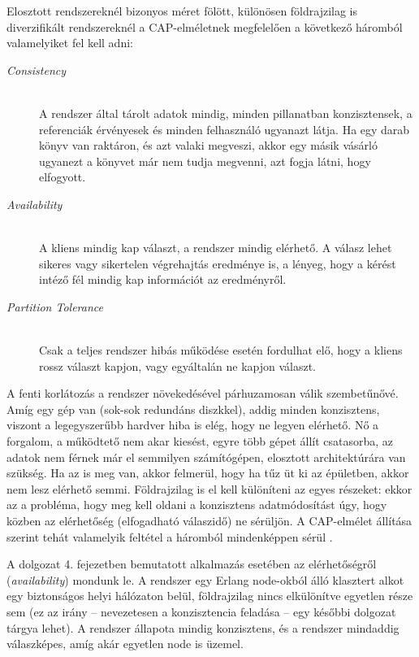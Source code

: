 \documentclass[12pt, a4paper, oneside]{book}
\begin{document}
Elosztott rendszereknél bizonyos méret fölött, különösen földrajzilag is
diverzifikált rendszereknél a CAP-elméletnek megfelelően a következő háromból
valamelyiket fel kell adni:
\begin{description}
\item[\emph{Consistency}] \hfill \\
 A rendszer által tárolt adatok mindig, minden pillanatban konzisztensek, a
referenciák érvényesek és minden felhasználó ugyanazt látja. Ha egy darab könyv
van raktáron, és azt valaki megveszi, akkor egy másik vásárló ugyanezt a
könyvet már nem tudja megvenni, azt fogja látni, hogy elfogyott.

\item[\emph{Availability}] \hfill \\
  A kliens mindig kap választ, a rendszer mindig elérhető. A válasz lehet
sikeres vagy sikertelen végrehajtás eredménye is, a lényeg, hogy a kérést
intéző fél mindig kap információt az eredményről.

\item[\emph{Partition Tolerance}] \hfill \\
 Csak a teljes rendszer hibás működése esetén fordulhat elő, hogy a kliens
rossz választ kapjon, vagy egyáltalán ne kapjon választ.
\end{description}

\noindent A fenti korlátozás a rendszer növekedésével párhuzamosan válik
szembetűnővé. Amíg egy gép van (sok-sok redundáns diszkkel), addig minden
konzisztens, viszont a legegyszerűbb hardver hiba is elég, hogy ne legyen
elérhető. Nő a forgalom, a működtető nem akar kiesést, egyre több gépet állít
csatasorba, az adatok nem férnek már el semmilyen számítógépen, elosztott
architektúrára van szükség. Ha az is meg van, akkor felmerül, hogy ha tűz üt ki
az épületben, akkor nem lesz elérhető semmi. Földrajzilag is el kell különíteni
az egyes részeket: ekkor az a probléma, hogy meg kell oldani a konzisztens
adatmódosítást úgy, hogy közben az elérhetőség (elfogadható válaszidő) ne
sérüljön. A CAP-elmélet állítása szerint tehát valamelyik feltétel a háromból
mindenképpen sérül \citep{CAP}.

A dolgozat 4. fejezetben bemutatott alkalmazás esetében az
elérhetőségről (\emph{availability}) mondunk le. A rendszer egy Erlang
node-okból álló klasztert alkot egy biztonságos helyi hálózaton belül,
földrajzilag nincs elkülönítve egyetlen része sem (ez az irány -- nevezetesen a
konzisztencia feladása -- egy későbbi dolgozat tárgya lehet). A rendszer
állapota mindig konzisztens, és a rendszer mindaddig válaszképes, amíg akár
egyetlen node is üzemel.
\end{document}
